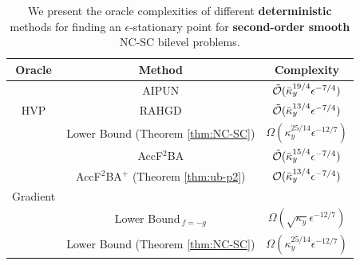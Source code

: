 \documentclass{article}
\begin{document}
\begin{table}[htbp] 
    \centering
     \caption{We present the oracle complexities of different \textbf{deterministic} methods for finding an $\epsilon$-stationary point for \textbf{second-order smooth} NC-SC bilevel problems.}
    \label{tab:det-second-smooth}
    \begin{tabular}{c c c}
    \hline 
    Oracle   &  Method & Complexity \\ 
    \hline \addlinespace 
    & AIPUN \citep{wang2024efficient} &  $\tilde {{\mathcal{O}}}(\bar \kappa_y^{19/4} \epsilon^{-7/4})$ \\ \addlinespace
    HVP    & RAHGD \citep{yang2023accelerating} & $\tilde {{\mathcal{O}}}(\bar \kappa_y^{13/4} \epsilon^{-7/4})$ \\  \addlinespace 
    & \cellcolor{gray!20} Lower Bound (Theorem \ref{thm:NC-SC}) & \cellcolor{gray!20} $\Omega(\kappa_y^{25/14} \epsilon^{-12/7})$ \\ 
    \hline \addlinespace 
    & AccF${}^2$BA \citep{chen2023near} & $\tilde {{\mathcal{O}}}(\bar \kappa_y^{15/4} \epsilon^{-7/4})$ \\
    \addlinespace 
    & \cellcolor{gray!20} AccF${}^2$BA${}^+$ (Theorem \ref{thm:ub-p2}) & 
    \cellcolor{gray!20}
    ${\mathcal{O}}(\bar \kappa_y^{13/4} \epsilon^{-7/4})$  \\ 
    \vspace{-2.5mm} 
    Gradient \\
    & Lower Bound$_{~f=-g}$ \citep{wang2024efficient} & $\Omega( \sqrt{\kappa_y} \epsilon^{-12/7})$ \\
    \addlinespace
    &
    \cellcolor{gray!20}
    Lower Bound (Theorem \ref{thm:NC-SC}) &
    \cellcolor{gray!20}
    $\Omega(\kappa_y^{25/14} \epsilon^{-12/7})$ \\ 
    \hline
    \end{tabular}
\end{table}
\end{document}
